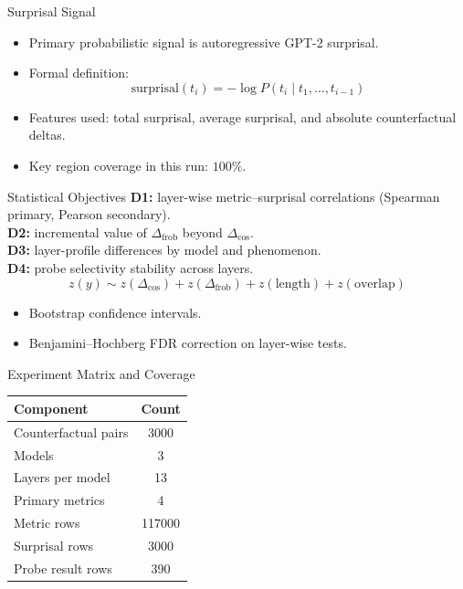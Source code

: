 \documentclass[aspectratio=169,11pt]{beamer}
\begin{document}
\begin{frame}{Surprisal Signal}
\begin{itemize}
  \item Primary probabilistic signal is autoregressive GPT-2 surprisal.
  \item Formal definition:
  \[
  \text{surprisal}(t_i) = - \log P(t_i \mid t_1,\ldots,t_{i-1})
  \]
  \item Features used:
  total surprisal, average surprisal, and absolute counterfactual deltas.
  \item Key region coverage in this run: \(100\%\).
\end{itemize}
\end{frame}

\begin{frame}{Statistical Objectives}
\small
\textbf{D1:} layer-wise metric--surprisal correlations (Spearman primary, Pearson secondary).\\
\textbf{D2:} incremental value of \(\Delta_{\text{frob}}\) beyond \(\Delta_{\cos}\).\\
\textbf{D3:} layer-profile differences by model and phenomenon.\\
\textbf{D4:} probe selectivity stability across layers.
\vspace{0.4em}
\[
z(y) \sim z(\Delta_{\cos}) + z(\Delta_{\text{frob}}) + z(\text{length}) + z(\text{overlap})
\]
\normalsize
\vspace{0.3em}
\begin{itemize}
  \item Bootstrap confidence intervals.
  \item Benjamini--Hochberg FDR correction on layer-wise tests.
\end{itemize}
\end{frame}

\begin{frame}{Experiment Matrix and Coverage}
\begin{table}
\centering
\small
\begin{tabular}{lc}
\toprule
\textbf{Component} & \textbf{Count} \\
\midrule
Counterfactual pairs & 3000 \\
Models & 3 \\
Layers per model & 13 \\
Primary metrics & 4 \\
Metric rows & 117000 \\
Surprisal rows & 3000 \\
Probe result rows & 390 \\
\bottomrule
\end{tabular}
\end{table}
\end{frame}
\end{document}
